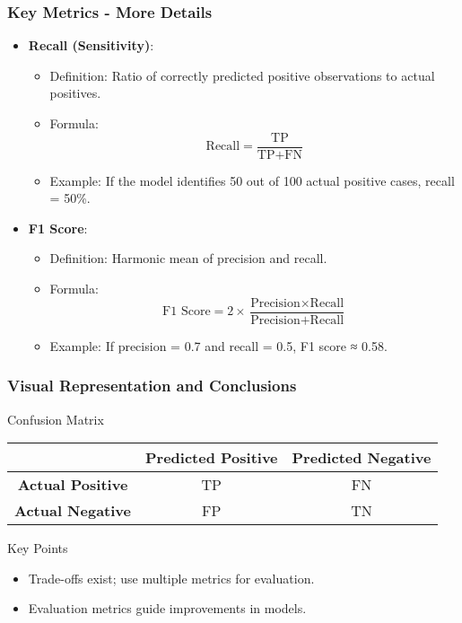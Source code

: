 \documentclass{beamer}
\begin{document}
\begin{frame}[fragile]
    \frametitle{Key Metrics - More Details}
    \begin{itemize}
        \item \textbf{Recall (Sensitivity)}:
        \begin{itemize}
            \item Definition: Ratio of correctly predicted positive observations to actual positives.
            \item Formula:
            \begin{equation}
            \text{Recall} = \frac{\text{TP}}{\text{TP} + \text{FN}}
            \end{equation}
            \item Example: If the model identifies 50 out of 100 actual positive cases, recall = 50\%.
        \end{itemize}

        \item \textbf{F1 Score}:
        \begin{itemize}
            \item Definition: Harmonic mean of precision and recall.
            \item Formula:
            \begin{equation}
            \text{F1 Score} = 2 \times \frac{\text{Precision} \times \text{Recall}}{\text{Precision} + \text{Recall}}
            \end{equation}
            \item Example: If precision = 0.7 and recall = 0.5, F1 score ≈ 0.58.
        \end{itemize}
    \end{itemize}
\end{frame}

\begin{frame}
    \frametitle{Visual Representation and Conclusions}
    \begin{block}{Confusion Matrix}
        \begin{center}
        \begin{tabular}{|c|c|c|}
            \hline
            & \textbf{Predicted Positive} & \textbf{Predicted Negative} \\
            \hline
            \textbf{Actual Positive} & TP & FN \\
            \hline
            \textbf{Actual Negative} & FP & TN \\
            \hline
        \end{tabular}
        \end{center}
    \end{block}

    \begin{block}{Key Points}
        \begin{itemize}
            \item Trade-offs exist; use multiple metrics for evaluation.
            \item Evaluation metrics guide improvements in models.
            \end{itemize}
    \end{block}
\end{frame}
\end{document}
